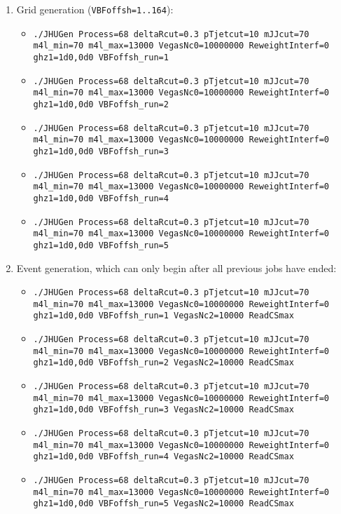 \documentclass[aps,superscriptaddress,nofootinbib]{revtex4}
\begin{document}
\begin{enumerate}
	\item Grid generation (\verb|VBFoffsh=1..164|):
	\begin{itemize}
		\item \texttt{./JHUGen Process=68 deltaRcut=0.3 pTjetcut=10 mJJcut=70 m4l\_min=70 m4l\_max=13000 VegasNc0=10000000 ReweightInterf=0 ghz1=1d0,0d0 VBFoffsh\_run=1}
		\item \texttt{./JHUGen Process=68 deltaRcut=0.3 pTjetcut=10 mJJcut=70 m4l\_min=70 m4l\_max=13000 VegasNc0=10000000 ReweightInterf=0 ghz1=1d0,0d0 VBFoffsh\_run=2}
		\item \texttt{./JHUGen Process=68 deltaRcut=0.3 pTjetcut=10 mJJcut=70 m4l\_min=70 m4l\_max=13000 VegasNc0=10000000 ReweightInterf=0 ghz1=1d0,0d0 VBFoffsh\_run=3}
		\item \texttt{./JHUGen Process=68 deltaRcut=0.3 pTjetcut=10 mJJcut=70 m4l\_min=70 m4l\_max=13000 VegasNc0=10000000 ReweightInterf=0 ghz1=1d0,0d0 VBFoffsh\_run=4}
		\item \texttt{./JHUGen Process=68 deltaRcut=0.3 pTjetcut=10 mJJcut=70 m4l\_min=70 m4l\_max=13000 VegasNc0=10000000 ReweightInterf=0 ghz1=1d0,0d0 VBFoffsh\_run=5}
	\end{itemize}
	\item Event generation, which can only begin after all previous jobs have ended:
	\begin{itemize}
		\item \texttt{./JHUGen Process=68 deltaRcut=0.3 pTjetcut=10 mJJcut=70 m4l\_min=70 m4l\_max=13000 VegasNc0=10000000 ReweightInterf=0 ghz1=1d0,0d0 VBFoffsh\_run=1 VegasNc2=10000 ReadCSmax}
		\item \texttt{./JHUGen Process=68 deltaRcut=0.3 pTjetcut=10 mJJcut=70 m4l\_min=70 m4l\_max=13000 VegasNc0=10000000 ReweightInterf=0 ghz1=1d0,0d0 VBFoffsh\_run=2 VegasNc2=10000 ReadCSmax}
		\item \texttt{./JHUGen Process=68 deltaRcut=0.3 pTjetcut=10 mJJcut=70 m4l\_min=70 m4l\_max=13000 VegasNc0=10000000 ReweightInterf=0 ghz1=1d0,0d0 VBFoffsh\_run=3 VegasNc2=10000 ReadCSmax}
		\item \texttt{./JHUGen Process=68 deltaRcut=0.3 pTjetcut=10 mJJcut=70 m4l\_min=70 m4l\_max=13000 VegasNc0=10000000 ReweightInterf=0 ghz1=1d0,0d0 VBFoffsh\_run=4 VegasNc2=10000 ReadCSmax}
		\item \texttt{./JHUGen Process=68 deltaRcut=0.3 pTjetcut=10 mJJcut=70 m4l\_min=70 m4l\_max=13000 VegasNc0=10000000 ReweightInterf=0 ghz1=1d0,0d0 VBFoffsh\_run=5 VegasNc2=10000 ReadCSmax}
	\end{itemize}
\end{enumerate}
\end{document}
